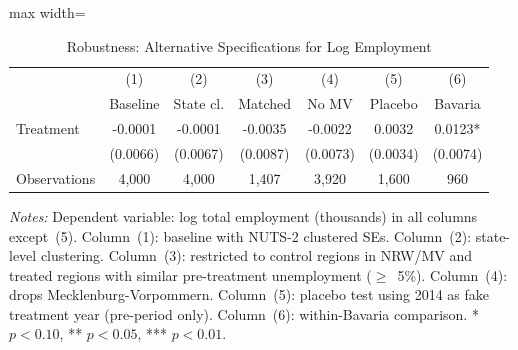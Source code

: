 \begin{table}[H]
\centering
\caption{Robustness: Alternative Specifications for Log Employment}
\label{tab:robustness}
\begin{threeparttable}
\begin{adjustbox}{max width=\textwidth}
\begin{tabular}{lcccccc}
\toprule
 & (1) & (2) & (3) & (4) & (5) & (6) \\
 & Baseline & State cl. & Matched & No MV & Placebo & Bavaria \\
\midrule
Treatment & -0.0001 & -0.0001 & -0.0035 & -0.0022 & 0.0032 & 0.0123* \\
          & (0.0066) & (0.0067) & (0.0087) & (0.0073) & (0.0034) & (0.0074) \\
\midrule
Observations & 4,000 & 4,000 & 1,407 & 3,920 & 1,600 & 960 \\
\bottomrule
\end{tabular}
\end{adjustbox}
\begin{tablenotes}[flushleft]
\footnotesize
\item \textit{Notes:} Dependent variable: log total employment (thousands) in all columns except~(5). Column~(1): baseline with NUTS-2 clustered SEs. Column~(2): state-level clustering. Column~(3): restricted to control regions in NRW/MV and treated regions with similar pre-treatment unemployment ($\geq$~5\%). Column~(4): drops Mecklenburg-Vorpommern. Column~(5): placebo test using 2014 as fake treatment year (pre-period only). Column~(6): within-Bavaria comparison. * $p<0.10$, ** $p<0.05$, *** $p<0.01$.
\end{tablenotes}
\end{threeparttable}
\end{table}
